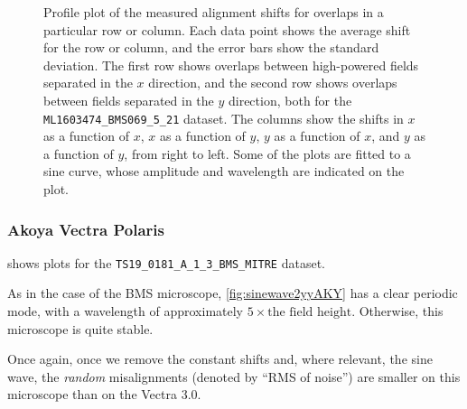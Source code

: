 \documentclass{article}
\begin{document}
\begin{figure}[ht]
\begin{subfigure}{0.24\linewidth}
		\caption{}
		\label{fig:sinewave4yyBMS}
	\end{subfigure}
	\caption{Profile plot of the measured alignment shifts for overlaps in a particular row or column.  Each data point shows the average shift for the row or column, and the error bars show the standard deviation.  The first row shows overlaps between high-powered fields separated in the $x$ direction, and the second row shows overlaps between fields separated in the $y$ direction, both for the \texttt{ML1603474\_BMS069\_5\_21} dataset.  The columns show the shifts in $x$ as a function of $x$, $x$ as a function of $y$, $y$ as a function of $x$, and $y$ as a function of $y$, from right to left.  Some of the plots are fitted to a sine curve, whose amplitude and wavelength are indicated on the plot.}
	\label{fig:sinewavesBMS}
\end{figure}

\subsubsection{Akoya Vectra Polaris}
\label{sec:akoyapolarisperiodic}

 shows plots for the \texttt{TS19\_0181\_A\_1\_3\_BMS\_MITRE} dataset.

As in the case of the BMS microscope, \cref{fig:sinewave2yyAKY} has a clear periodic mode, with a wavelength of approximately $5\times\text{the field height}$.  Otherwise, this microscope is quite stable.

Once again, once we remove the constant shifts and, where relevant, the sine wave, the \emph{random} misalignments (denoted by ``RMS of noise'') are smaller on this microscope than on the Vectra 3.0.
\end{document}
